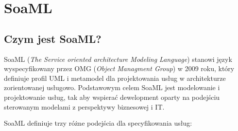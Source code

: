 \section{SoaML}
\subsection{Czym jest SoaML?}
SoaML (\emph{The Service oriented architecture Modeling Language}) stanowi język wyspecyfikowany przez OMG (\emph{Object Managment Group}) w 2009 roku, który definiuje profil UML i metamodel dla projektowania usług w architekturze zorientowanej usługowo. Podstawowym celem SoaML jest modelowanie i projektowanie usług, tak aby wspierać dewelopment oparty na podejściu sterowanym modelami z perspektywy biznesowej i IT.

SoaML definiuje trzy różne podejścia dla specyfikowania usług: 
